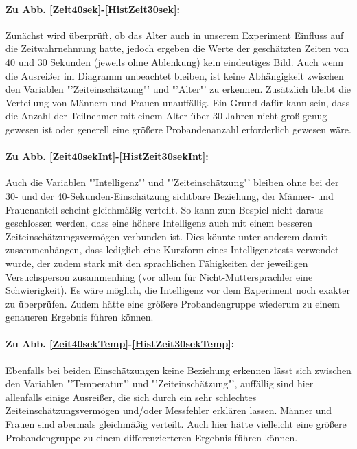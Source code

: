 \documentclass{Paper}
\begin{document}
\paragraph{Zu Abb. \ref{Zeit40sek}-\ref{HistZeit30sek}:}
Zunächst wird überprüft, ob das Alter auch in unserem Experiment Einfluss auf die Zeitwahrnehmung hatte, jedoch ergeben die Werte der geschätzten Zeiten von 40 und 30 Sekunden (jeweils ohne Ablenkung) kein eindeutiges Bild. Auch wenn die Ausreißer im Diagramm unbeachtet bleiben, ist keine Abhängigkeit zwischen den Variablen "'Zeiteinschätzung"' und "'Alter"' zu erkennen. Zusätzlich bleibt die Verteilung von Männern und Frauen unauffällig. Ein Grund dafür kann sein, dass die Anzahl der Teilnehmer mit einem Alter über 30 Jahren nicht groß genug gewesen ist oder generell eine größere Probandenanzahl erforderlich gewesen wäre.

\paragraph{Zu Abb. \ref{Zeit40sekInt}-\ref{HistZeit30sekInt}:} Auch die Variablen "'Intelligenz"' und "'Zeiteinschätzung"' bleiben ohne bei der 30- und der 40-Sekunden-Einschätzung sichtbare Beziehung, der Männer- und Frauenanteil scheint gleichmäßig verteilt. So kann zum Bespiel nicht daraus geschlossen werden, dass eine höhere Intelligenz auch mit einem besseren Zeiteinschätzungsvermögen verbunden ist. Dies könnte unter anderem damit zusammenhängen, dass lediglich eine Kurzform eines Intelligenztests verwendet wurde, der zudem stark mit den sprachlichen Fähigkeiten der jeweiligen Versuchsperson zusammenhing (vor allem für Nicht-Muttersprachler eine Schwierigkeit). Es wäre möglich, die Intelligenz vor dem Experiment noch exakter zu überprüfen. Zudem hätte eine größere Probandengruppe wiederum zu einem genaueren Ergebnis führen können.

\paragraph{Zu Abb. \ref{Zeit40sekTemp}-\ref{HistZeit30sekTemp}:} Ebenfalls bei beiden Einschätzungen keine Beziehung erkennen lässt sich zwischen den Variablen "'Temperatur"' und "'Zeiteinschätzung"', auffällig sind hier allenfalls einige Ausreißer, die sich durch ein sehr schlechtes Zeiteinschätzungsvermögen und/oder Messfehler erklären lassen. Männer und Frauen sind abermals gleichmäßig verteilt. Auch hier hätte vielleicht eine größere Probandengruppe zu einem differenzierteren Ergebnis führen können.
\end{document}
